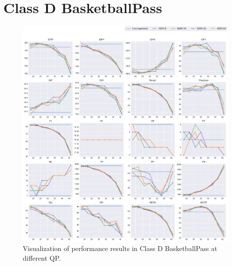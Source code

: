 
\section{Class D BasketballPass}
\label{sec:appendix/BasketballPass_all}


\begin{figure}[!htbp]
\centering
\includegraphics[width=1.0\linewidth]{img/appendix/BasketballPass_all_multiplots_qp.pdf}
\caption[Visualization of performance results in Class D BasketballPass at different QP]
{Visualization of performance results in Class D BasketballPass at different QP.}
\label{fig:BasketballPass_all_qp}
\end{figure}

